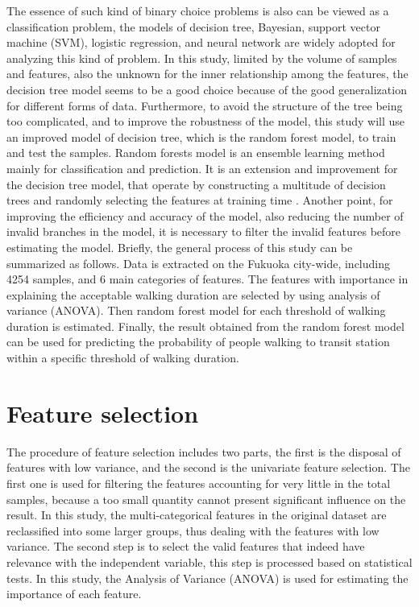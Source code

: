 \documentclass[Journal,letterpaper]{ascelike-new}
\begin{document}
The essence of such kind of binary choice problems is also can be viewed as a classification problem, the models of decision tree, Bayesian, support vector machine (SVM), logistic regression, and neural network are widely adopted for analyzing this kind of problem. In this study, limited by the volume of samples and features, also the unknown for the inner relationship among the features, the decision tree model seems to be a good choice because of the good generalization for different forms of data. Furthermore, to avoid the structure of the tree being too complicated, and to improve the robustness of the model, this study will use an improved model of decision tree, which is the random forest model, to train and test the samples. Random forests model is an ensemble learning method mainly for classification and prediction. It is an extension and improvement for the decision tree model, that operate by constructing a multitude of decision trees and randomly selecting the features at training time \cite{Ho1995,Ho1998}. Another point, for improving the efficiency and accuracy of the model, also reducing the number of invalid branches in the model, it is necessary to filter the invalid features before estimating the model.
%
Briefly, the general process of this study can be summarized as follows. Data is extracted on the Fukuoka city-wide, including 4254 samples, and 6 main categories of features. The features with importance in explaining the acceptable walking duration are selected by using analysis of variance (ANOVA). Then random forest model for each threshold of walking duration is estimated. Finally, the result obtained from the random forest model can be used for predicting the probability of people walking to transit station within a specific threshold of walking duration.
%
\section{Feature selection}
The procedure of feature selection includes two parts, the first is the disposal of features with low variance, and the second is the univariate feature selection. The first one is used for filtering the features accounting for very little in the total samples, because a too small quantity cannot present significant influence on the result. In this study, the multi-categorical features in the original dataset are reclassified into some larger groups, thus dealing with the features with low variance. The second step is to select the valid features that indeed have relevance with the independent variable, this step is processed based on statistical tests. In this study, the Analysis of Variance (ANOVA) is used for estimating the importance of each feature.
%
\end{document}
